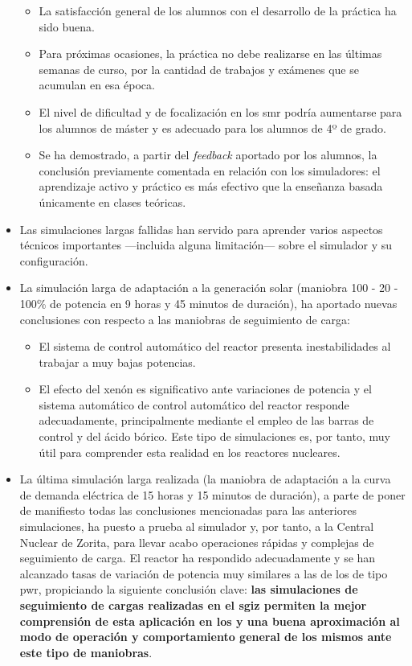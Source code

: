 \begin{itemize}
\begin{itemize}
        \item La satisfacción general de los alumnos con el desarrollo de la práctica ha sido buena.
        \item Para próximas ocasiones, la práctica no debe realizarse en las últimas semanas de curso, por la cantidad de trabajos y exámenes que se acumulan en esa época.
        \item El nivel de dificultad y de focalización en los \acrshort{smr} podría aumentarse para los alumnos de máster y es adecuado para los alumnos de 4º de grado.
        \item Se ha demostrado, a partir del \textit{feedback} aportado por los alumnos, la conclusión previamente comentada en relación con los simuladores: el aprendizaje activo y práctico es más efectivo que la enseñanza basada únicamente en clases teóricas.
    \end{itemize} 
    \item Las simulaciones largas fallidas han servido para aprender varios aspectos técnicos importantes ---incluida alguna limitación--- sobre el simulador y su configuración.
    \item La simulación larga de adaptación a la generación solar (maniobra 100 - 20 - 100\% de potencia en 9 horas y 45 minutos de duración), ha aportado nuevas conclusiones con respecto a las maniobras de seguimiento de carga:
    \begin{itemize}
        \item El sistema de control automático del reactor presenta inestabilidades al trabajar a muy bajas potencias.
        \item El efecto del xenón es significativo ante variaciones de potencia y el sistema automático de control automático del reactor responde adecuadamente, principalmente mediante el empleo de las barras de control y del ácido bórico. Este tipo de simulaciones es, por tanto, muy útil para comprender esta realidad en los reactores nucleares.
    \end{itemize} 
    \item La última simulación larga realizada (la maniobra de adaptación a la curva de demanda eléctrica de 15 horas y 15 minutos de duración), a parte de poner de manifiesto todas las conclusiones mencionadas para las anteriores simulaciones, ha puesto a prueba al simulador y, por tanto, a la Central Nuclear de Zorita, para llevar acabo operaciones rápidas y complejas de seguimiento de carga. El reactor ha respondido adecuadamente y se han alcanzado tasas de variación de potencia muy similares a las de los  de tipo \acrshort{pwr}, propiciando la siguiente conclusión clave: \textbf{las simulaciones de seguimiento de cargas realizadas en el \acrshort{sgiz} permiten la mejor comprensión de esta aplicación en los  y una buena aproximación al modo de operación y comportamiento general de los mismos ante este tipo de maniobras}.

\end{itemize}
